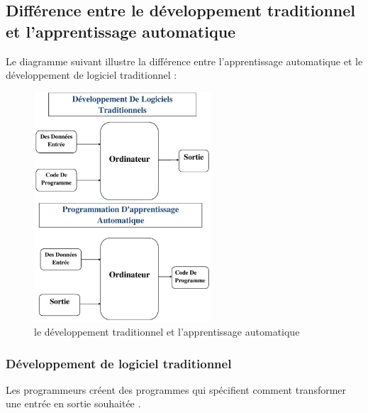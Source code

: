 \documentclass[12pt]{report}
\begin{document}
\subsection{Différence entre le développement traditionnel et l'apprentissage automatique }
Le diagramme suivant illustre la différence entre l'apprentissage automatique et le développement de logiciel traditionnel \cite{ref25} :
\begin{figure}[h]
\begin{center}
\includegraphics[width=250]{jkjk.jpg}
\caption{le développement traditionnel et l'apprentissage automatique}
\end{center}
\end{figure}

\subsubsection{Développement de logiciel traditionnel}
Les programmeurs créent des programmes qui spécifient comment transformer une entrée en sortie souhaitée \cite{ref25} .
\end{document}
